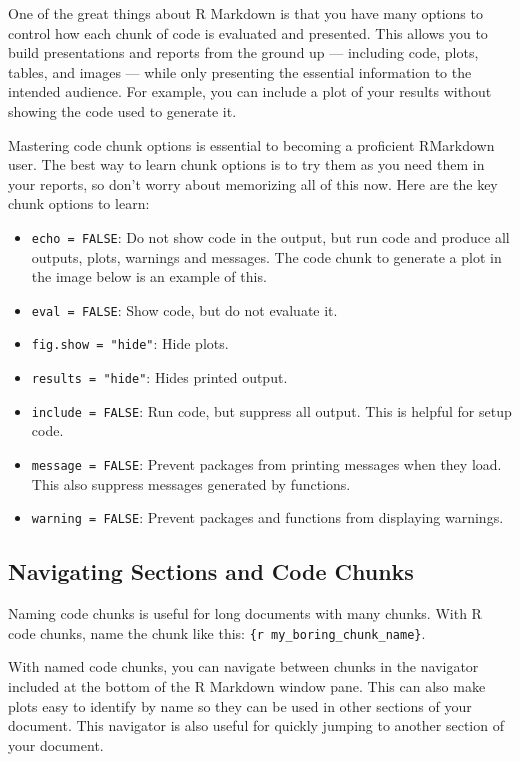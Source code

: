 \documentclass[
]{book}
\providecommand{\tightlist}{%
  \setlength{\itemsep}{0pt}\setlength{\parskip}{0pt}}
\begin{document}
One of the great things about R Markdown is that you have many options to control how each chunk of code is evaluated and presented. This allows you to build presentations and reports from the ground up --- including code, plots, tables, and images --- while only presenting the essential information to the intended audience. For example, you can include a plot of your results without showing the code used to generate it.

Mastering code chunk options is essential to becoming a proficient RMarkdown user. The best way to learn chunk options is to try them as you need them in your reports, so don't worry about memorizing all of this now. Here are the key chunk options to learn:

\begin{itemize}
\tightlist
\item
  \texttt{echo\ =\ FALSE}: Do not show code in the output, but run code and produce all outputs, plots, warnings and messages. The code chunk to generate a plot in the image below is an example of this.
\item
  \texttt{eval\ =\ FALSE}: Show code, but do not evaluate it.
\item
  \texttt{fig.show\ =\ "hide"}: Hide plots.
\item
  \texttt{results\ =\ "hide"}: Hides printed output.
\item
  \texttt{include\ =\ FALSE}: Run code, but suppress all output. This is helpful for setup code.
\item
  \texttt{message\ =\ FALSE}: Prevent packages from printing messages when they load. This also suppress messages generated by functions.
\item
  \texttt{warning\ =\ FALSE}: Prevent packages and functions from displaying warnings.
\end{itemize}

\hypertarget{navigating-sections-and-code-chunks}{%
\subsection{Navigating Sections and Code Chunks}\label{navigating-sections-and-code-chunks}}

Naming code chunks is useful for long documents with many chunks. With R code chunks, name the chunk like this: \texttt{\{r\ my\_boring\_chunk\_name\}}.

With named code chunks, you can navigate between chunks in the navigator included at the bottom of the R Markdown window pane. This can also make plots easy to identify by name so they can be used in other sections of your document. This navigator is also useful for quickly jumping to another section of your document.
\end{document}
